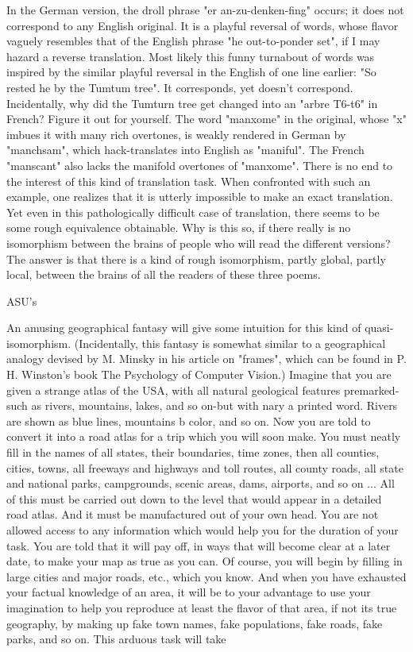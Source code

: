         In the German version, the droll phrase "er an-zu-denken-fing" occurs; it does not
correspond to any English original. It is a playful reversal of words, whose flavor vaguely
resembles that of the English phrase "he out-to-ponder set", if I may hazard a reverse
translation. Most likely this funny turnabout of words was inspired by the similar playful
reversal in the English of one line earlier: "So rested he by the Tumtum tree". It
corresponds, yet doesn't correspond.
        Incidentally, why did the Tumturn tree get changed into an "arbre T6-t6" in
French? Figure it out for yourself.
        The word "manxome" in the original, whose "x" imbues it with many rich
overtones, is weakly rendered in German by "manchsam", which hack-translates into
English as "maniful". The French "manscant" also lacks the manifold overtones of
"manxome". There is no end to the interest of this kind of translation task.
        When confronted with such an example, one realizes that it is utterly impossible
to make an exact translation. Yet even in this pathologically difficult case of translation,
there seems to be some rough equivalence obtainable. Why is this so, if there really is no
isomorphism between the brains of people who will read the different versions? The
answer is that there is a kind of rough isomorphism, partly global, partly local, between
the brains of all the readers of these three poems.

                                           ASU's

An amusing geographical fantasy will give some intuition for this kind of quasi-
isomorphism. (Incidentally, this fantasy is somewhat similar to a geographical analogy
devised by M. Minsky in his article on "frames", which can be found in P. H. Winston's
book The Psychology of Computer Vision.) Imagine that you are given a strange atlas of
the USA, with all natural geological features premarked-such as rivers, mountains, lakes,
and so on-but with nary a printed word. Rivers are shown as blue lines, mountains b
color, and so on. Now you are told to convert it into a road atlas for a trip which you will
soon make. You must neatly fill in the names of all states, their boundaries, time zones,
then all counties, cities, towns, all freeways and highways and toll routes, all county
roads, all state and national parks, campgrounds, scenic areas, dams, airports, and so on
... All of this must be carried out down to the level that would appear in a detailed road
atlas. And it must be manufactured out of your own head. You are not allowed access to
any information which would help you for the duration of your task.
        You are told that it will pay off, in ways that will become clear at a later date, to
make your map as true as you can. Of course, you will begin by filling in large cities and
major roads, etc., which you know. And when you have exhausted your factual
knowledge of an area, it will be to your advantage to use your imagination to help you
reproduce at least the flavor of that area, if not its true geography, by making up fake
town names, fake populations, fake roads, fake parks, and so on. This arduous task will
take





